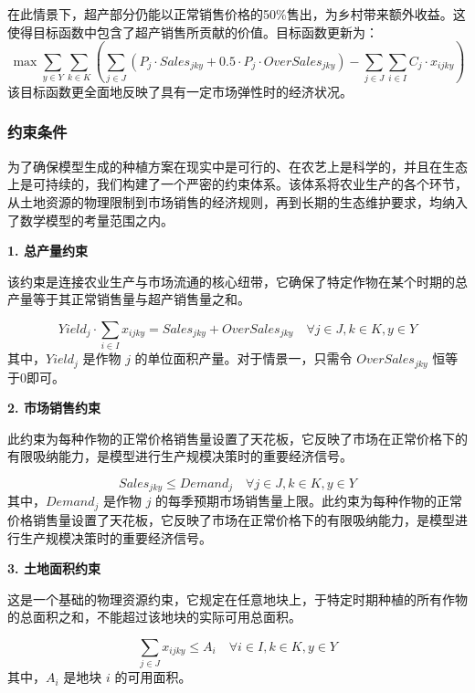 在此情景下，超产部分仍能以正常销售价格的50\%售出，为乡村带来额外收益。这使得目标函数中包含了超产销售所贡献的价值。目标函数更新为：
\begin{equation}
	\max \sum_{y \in Y} \sum_{k \in K} \left( \sum_{j \in J} (P_j \cdot Sales_{jky} + 0.5 \cdot P_j \cdot OverSales_{jky}) - \sum_{j \in J} \sum_{i \in I} C_j \cdot x_{ijky} \right)
\end{equation}
该目标函数更全面地反映了具有一定市场弹性时的经济状况。

\subsubsection{约束条件}

为了确保模型生成的种植方案在现实中是可行的、在农艺上是科学的，并且在生态上是可持续的，我们构建了一个严密的约束体系。该体系将农业生产的各个环节，从土地资源的物理限制到市场销售的经济规则，再到长期的生态维护要求，均纳入了数学模型的考量范围之内。

\textbf{1. 总产量约束}

该约束是连接农业生产与市场流通的核心纽带，它确保了特定作物在某个时期的总产量等于其正常销售量与超产销售量之和。

\begin{equation}
	Yield_j \cdot \sum_{i \in I} x_{ijky} = Sales_{jky} + OverSales_{jky} \quad \forall j \in J, k \in K, y \in Y
\end{equation}
其中，$Yield_j$ 是作物 $j$ 的单位面积产量。对于情景一，只需令 $OverSales_{jky}$ 恒等于0即可。

\textbf{2. 市场销售约束}

此约束为每种作物的正常价格销售量设置了天花板，它反映了市场在正常价格下的有限吸纳能力，是模型进行生产规模决策时的重要经济信号。

\begin{equation}
	Sales_{jky} \le Demand_j \quad \forall j \in J, k \in K, y \in Y
\end{equation}
其中，$Demand_j$ 是作物 $j$ 的每季预期市场销售量上限。此约束为每种作物的正常价格销售量设置了天花板，它反映了市场在正常价格下的有限吸纳能力，是模型进行生产规模决策时的重要经济信号。

\textbf{3. 土地面积约束}

这是一个基础的物理资源约束，它规定在任意地块上，于特定时期种植的所有作物的总面积之和，不能超过该地块的实际可用总面积。

\begin{equation}
	\sum_{j \in J} x_{ijky} \le A_i \quad \forall i \in I, k \in K, y \in Y
\end{equation}
其中，$A_i$ 是地块 $i$ 的可用面积。

